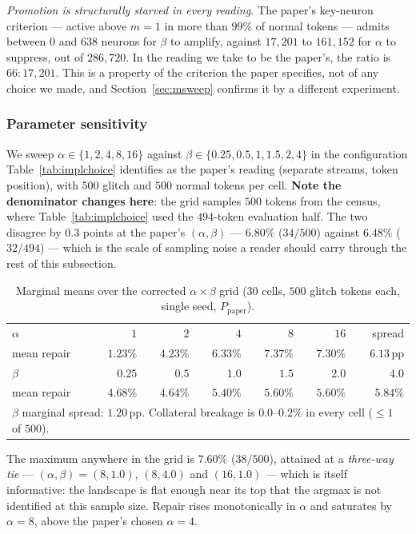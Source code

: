 \documentclass[11pt,a4paper]{article}
\newcommand{\Ppaper}{$P_{\mathrm{paper}}$}
\begin{document}
\emph{Promotion is structurally starved in every reading.} The paper's key-neuron
criterion --- active above $m = 1$ in more than $99\%$ of normal tokens --- admits
between $0$ and $638$ neurons for $\beta$ to amplify, against $17{,}201$ to
$161{,}152$ for $\alpha$ to suppress, out of $286{,}720$. In the reading we take
to be the paper's, the ratio is $66 : 17{,}201$. This is a property of the
criterion the paper specifies, not of any choice we made, and
Section~\ref{sec:msweep} confirms it by a different experiment.

\subsubsection{Parameter sensitivity}

We sweep $\alpha \in \{1, 2, 4, 8, 16\}$ against $\beta \in \{0.25, 0.5, 1, 1.5,
2, 4\}$ in the configuration Table~\ref{tab:implchoice} identifies as the paper's
reading (separate streams, token position), with $500$ glitch and $500$ normal
tokens per cell. \textbf{Note the denominator changes here}: the grid samples
$500$ tokens from the census, where Table~\ref{tab:implchoice} used the $494$-token
evaluation half. The two disagree by $0.3$ points at the paper's $(\alpha,\beta)$
--- $6.80\%$ ($34/500$) against $6.48\%$ ($32/494$) --- which is the scale of
sampling noise a reader should carry through the rest of this subsection.

\begin{table}[h]
\centering
\caption{Marginal means over the corrected $\alpha \times \beta$ grid
($30$ cells, $500$ glitch tokens each, single seed, \Ppaper{}).}
\label{tab:grid}
\begin{tabular}{lrrrrrr}
\toprule
$\alpha$ & $1$ & $2$ & $4$ & $8$ & $16$ & spread \\
mean repair & $1.23\%$ & $4.23\%$ & $6.33\%$ & $7.37\%$ & $7.30\%$ & $6.13$\,pp \\
\midrule
$\beta$ & $0.25$ & $0.5$ & $1.0$ & $1.5$ & $2.0$ & $4.0$ \\
mean repair & $4.68\%$ & $4.64\%$ & $5.40\%$ & $5.60\%$ & $5.60\%$ & $5.84\%$ \\
\bottomrule
\multicolumn{7}{l}{\footnotesize $\beta$ marginal spread: $1.20$\,pp. Collateral
breakage is $0.0$--$0.2\%$ in every cell ($\leq 1$ of $500$).}
\end{tabular}
\end{table}

The maximum anywhere in the grid is $7.60\%$ ($38/500$), attained at a
\emph{three-way tie} --- $(\alpha,\beta) = (8, 1.0)$, $(8, 4.0)$ and $(16, 1.0)$
--- which is itself informative: the landscape is flat enough near its top that
the argmax is not identified at this sample size. Repair rises monotonically in
$\alpha$ and saturates by $\alpha = 8$, above the paper's chosen $\alpha = 4$.
\end{document}
